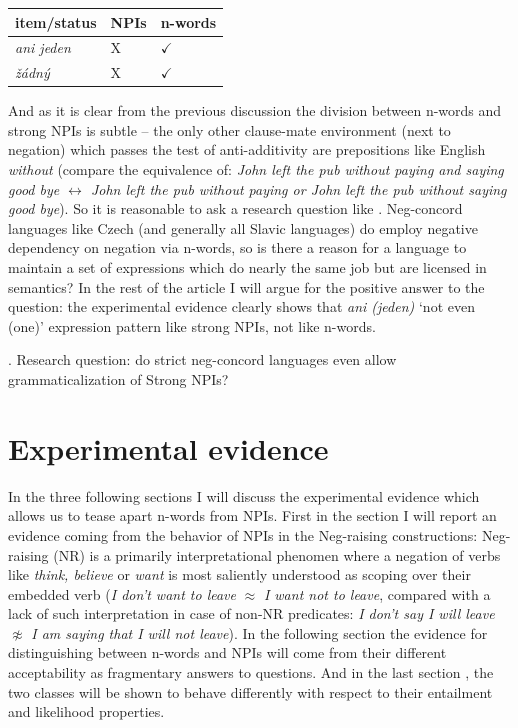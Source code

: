 \documentclass[12pt]{scrartcl}
\begin{document}
\begin{longtable}[]{@{}lll@{}}
\toprule
item/status & NPIs & n-words\tabularnewline
\midrule
\endhead
\emph{ani jeden} & X & \(\checkmark\)\tabularnewline
\emph{žádný} & X & \(\checkmark\)\tabularnewline
\bottomrule
\end{longtable}

And as it is clear from the previous discussion the division between n-words and strong NPIs is subtle -- the only other clause-mate environment (next to negation) which passes the test of anti-additivity are prepositions like English \textit{without} (compare the equivalence of: \textit{John left the pub without paying and saying good bye $\leftrightarrow$ John left the pub without paying or John left the pub without saying good bye}). So it is reasonable to ask a research question like \Next. Neg-concord languages like Czech (and generally all Slavic languages) do employ negative dependency on negation via n-words, so is there a reason for a language to maintain a set of expressions which do nearly the same job but are licensed in semantics? In the rest of the article I will argue for the positive answer to the question: the experimental evidence clearly shows that \textit{ani (jeden)} `not even (one)' expression pattern like strong NPIs, not like n-words.

\ex. Research question: do strict neg-concord languages even allow grammaticalization of Strong NPIs?

\hypertarget{experimental-evidence}{%
\section{Experimental evidence}\label{experimental-evidence}}

In the three following sections I will discuss the experimental evidence which allows us to tease apart n-words from NPIs. First in the section \textbf{} I will report an evidence coming from the behavior of NPIs in the Neg-raising constructions: Neg-raising (NR) is a primarily interpretational phenomen where a negation of verbs like \textit{think, believe} or \textit{want} is most saliently understood as scoping over their embedded verb (\textit{I don't want to leave} $\approx$ \textit{I want not to leave}, compared with a lack of such interpretation in case of non-NR predicates: \textit{I don't say I will leave} $\not\approx$ \textit{I am saying that I will not leave}). In the following section \textbf{} the evidence for distinguishing between n-words and NPIs will come from their different acceptability as fragmentary answers to questions. And in the last section \textbf{}, the two classes will be shown to behave differently with respect to their entailment and likelihood properties.
\end{document}
